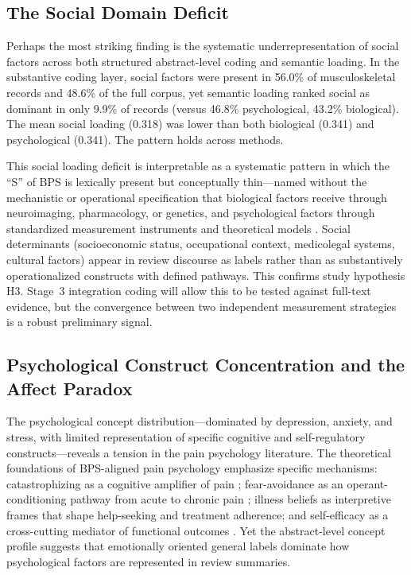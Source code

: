 \documentclass[11pt]{article}
\begin{document}
\subsection{The Social Domain Deficit}

Perhaps the most striking finding is the systematic underrepresentation of social factors across both structured abstract-level coding and semantic loading. In the substantive coding layer, social factors were present in 56.0\% of musculoskeletal records and 48.6\% of the full corpus, yet semantic loading ranked social as dominant in only 9.9\% of records (versus 46.8\% psychological, 43.2\% biological). The mean social loading (0.318) was lower than both biological (0.341) and psychological (0.341). The pattern holds across methods.

This social loading deficit is interpretable as a systematic pattern in which the ``S'' of BPS is lexically present but conceptually thin---named without the mechanistic or operational specification that biological factors receive through neuroimaging, pharmacology, or genetics, and psychological factors through standardized measurement instruments and theoretical models \citep{dorner2011, harkness2005, edwards2016}. Social determinants (socioeconomic status, occupational context, medicolegal systems, cultural factors) appear in review discourse as labels rather than as substantively operationalized constructs with defined pathways. This confirms study hypothesis H3. Stage~3 integration coding will allow this to be tested against full-text evidence, but the convergence between two independent measurement strategies is a robust preliminary signal.

\subsection{Psychological Construct Concentration and the Affect Paradox}

The psychological concept distribution---dominated by depression, anxiety, and stress, with limited representation of specific cognitive and self-regulatory constructs---reveals a tension in the pain psychology literature. The theoretical foundations of BPS-aligned pain psychology emphasize specific mechanisms: catastrophizing as a cognitive amplifier of pain \citep{sullivan1995}; fear-avoidance as an operant-conditioning pathway from acute to chronic pain \citep{vlaeyen2000, vlaeyen2012}; illness beliefs as interpretive frames that shape help-seeking and treatment adherence; and self-efficacy as a cross-cutting mediator of functional outcomes \citep{bandura1977}. Yet the abstract-level concept profile suggests that emotionally oriented general labels dominate how psychological factors are represented in review summaries.
\end{document}
